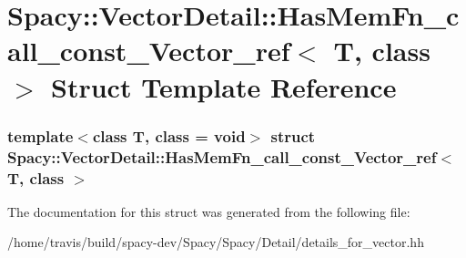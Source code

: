 \hypertarget{structSpacy_1_1VectorDetail_1_1HasMemFn__call__const__Vector__ref}{\section{\-Spacy\-:\-:\-Vector\-Detail\-:\-:\-Has\-Mem\-Fn\-\_\-call\-\_\-const\-\_\-\-Vector\-\_\-ref$<$ \-T, class $>$ \-Struct \-Template \-Reference}
\label{structSpacy_1_1VectorDetail_1_1HasMemFn__call__const__Vector__ref}
}
\subsubsection*{template$<$class T, class = void$>$ struct Spacy\-::\-Vector\-Detail\-::\-Has\-Mem\-Fn\-\_\-call\-\_\-const\-\_\-\-Vector\-\_\-ref$<$ T, class $>$}



\-The documentation for this struct was generated from the following file\-:\begin{DoxyCompactItemize}
\item 
/home/travis/build/spacy-\/dev/\-Spacy/\-Spacy/\-Detail/details\-\_\-for\-\_\-vector.\-hh\end{DoxyCompactItemize}
